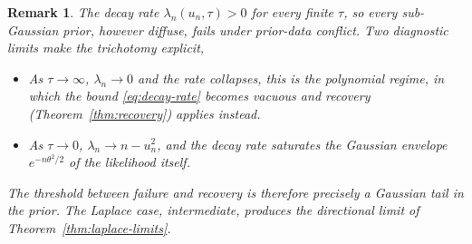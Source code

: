 \documentclass[numsec,webpdf,modern,medium,namedate]{oup-authoring-template}
\theoremstyle{thmstyleone}%
\theoremstyle{thmstyletwo}%
\newtheorem{remark}{Remark}%
\theoremstyle{thmstylethree}%
\newcommand{\1}{\mathbf{1}}
\begin{document}
 
\begin{remark}
The decay rate $\lambda_{n}(u_{n},\tau)>0$ for every finite $\tau$, so every sub-Gaussian prior, however diffuse, fails under prior-data conflict. Two diagnostic limits make the trichotomy explicit,
\begin{itemize}
\item As $\tau\to\infty$, $\lambda_{n}\to 0$ and the rate collapses, this is the polynomial regime, in which the bound \eqref{eq:decay-rate} becomes vacuous and recovery (Theorem~\ref{thm:recovery}) applies instead.
\item As $\tau\to 0$, $\lambda_{n}\to n-u_{n}^{2}$, and the decay rate saturates the Gaussian envelope $e^{-n\theta^{2}/2}$ of the likelihood itself.
\end{itemize}
The threshold between failure and recovery is therefore precisely a Gaussian tail in the prior. The Laplace case, intermediate, produces the directional limit of Theorem~\ref{thm:laplace-limits}.
\end{remark}
\end{document}
